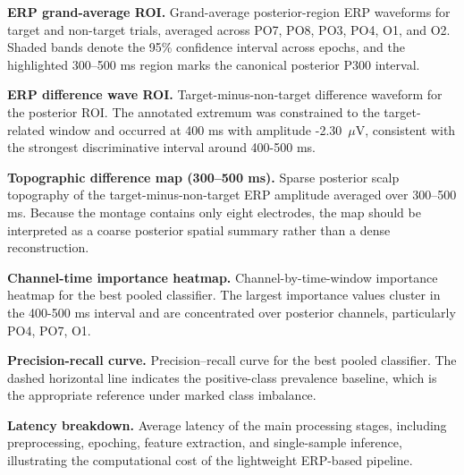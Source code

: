 \textbf{ERP grand-average ROI.} Grand-average posterior-region ERP waveforms for target and non-target trials, averaged across PO7, PO8, PO3, PO4, O1, and O2. Shaded bands denote the 95\% confidence interval across epochs, and the highlighted 300--500 ms region marks the canonical posterior P300 interval.

\textbf{ERP difference wave ROI.} Target-minus-non-target difference waveform for the posterior ROI. The annotated extremum was constrained to the target-related window and occurred at 400 ms with amplitude -2.30~$\mu$V, consistent with the strongest discriminative interval around 400-500 ms.

\textbf{Topographic difference map (300--500 ms).} Sparse posterior scalp topography of the target-minus-non-target ERP amplitude averaged over 300--500 ms. Because the montage contains only eight electrodes, the map should be interpreted as a coarse posterior spatial summary rather than a dense reconstruction.

\textbf{Channel-time importance heatmap.} Channel-by-time-window importance heatmap for the best pooled classifier. The largest importance values cluster in the 400-500 ms interval and are concentrated over posterior channels, particularly PO4, PO7, O1.

\textbf{Precision-recall curve.} Precision--recall curve for the best pooled classifier. The dashed horizontal line indicates the positive-class prevalence baseline, which is the appropriate reference under marked class imbalance.

\textbf{Latency breakdown.} Average latency of the main processing stages, including preprocessing, epoching, feature extraction, and single-sample inference, illustrating the computational cost of the lightweight ERP-based pipeline.
